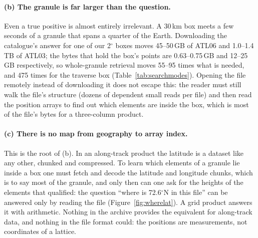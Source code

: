 \documentclass[10pt,a4paper]{article}
\begin{document}
\paragraph{(b) The granule is far larger than the question.} Even a true positive is almost entirely irrelevant.
A 30\,km box meets a few seconds of a granule that spans a quarter of the Earth. Downloading the catalogue's
answer for one of our 2$^\circ$ boxes moves 45--50\,GB of ATL06 and 1.0--1.4\,TB of ATL03; the bytes that hold
the box's points are 0.63--0.75\,GB and 12--25\,GB respectively, so whole-granule retrieval moves 55--95 times what
is needed, and 475 times for the traverse box (Table~\ref{tab:searchmodes}). Opening the file remotely instead of
downloading it does not escape this: the reader must still walk the file's structure (dozens of dependent small
reads per file) and then read the position arrays to find out which elements are inside the box, which is most of
the file's bytes for a three-column product.

\paragraph{(c) There is no map from geography to array index.} This is the root of (b). In an along-track product
the latitude is a dataset like any other, chunked and compressed. To learn which elements of a granule lie inside a
box one must fetch and decode the latitude and longitude chunks, which is to say most of the granule, and only then
can one ask for the heights of the elements that qualified: the question ``where is 72.6$^\circ$N in this file''
can be answered only by reading the file (Figure~\ref{fig:wherelat}). A grid product answers it with arithmetic.
Nothing in the archive provides the equivalent for along-track data, and nothing in the file format could: the
positions are measurements, not coordinates of a lattice.
\end{document}
